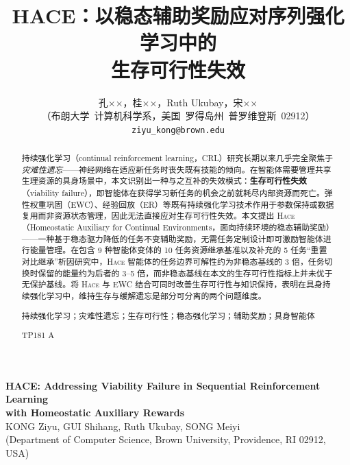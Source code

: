 \documentclass[zihao=5,a4paper,linespread=1.3,fontset=fandol]{ctexart}
\title{\heiti HACE：以稳态辅助奖励应对序列强化学习中的\\生存可行性失效}
\author{孔××，桂××，Ruth Ukubay，宋××\\[0.3em]
{\zihao{-5}（布朗大学~计算机科学系，美国~罗得岛州~普罗维登斯~02912）}\\[0.2em]
{\zihao{-5}\texttt{ziyu\_kong@brown.edu}}}
\date{}
\newcommand{\hace}{\textsc{Hace}}
\begin{document}
\maketitle

\begin{abstract}
持续强化学习（continual reinforcement learning，CRL）研究长期以来几乎完全聚焦于\emph{灾难性遗忘}——神经网络在适应新任务时丧失既有技能的倾向。在智能体需要管理共享生理资源的具身场景中，本文识别出一种与之互补的失效模式：\textbf{生存可行性失效}（viability failure），即智能体在获得学习新任务的机会之前就耗尽内部资源而死亡。弹性权重巩固（EWC）、经验回放（ER）等既有持续强化学习技术作用于参数保持或数据复用而非资源状态管理，因此无法直接应对生存可行性失效。本文提出 \hace{}（Homeostatic Auxiliary for Continual Environments，面向持续环境的稳态辅助奖励）——一种基于稳态驱力降低的任务不变辅助奖励，无需任务定制设计即可激励智能体进行能量管理。在包含 9 种智能体变体的 10 任务资源继承基准以及补充的 5 任务“重置对比继承”析因研究中，\hace{} 智能体的任务边界可解性约为非稳态基线的 3 倍，任务切换时保留的能量约为后者的 3--5 倍，而非稳态基线在本文的生存可行性指标上并未优于无保护基线。将 \hace{} 与 EWC 结合可同时改善生存可行性与知识保持，表明在具身持续强化学习中，维持生存与缓解遗忘是部分可分离的两个问题维度。

\vspace{0.5em}
持续强化学习；灾难性遗忘；生存可行性；稳态强化学习；辅助奖励；具身智能体

\vspace{0.5em}
TP181 A
\end{abstract}

\vspace{1em}
\begin{center}
{\bfseries HACE: Addressing Viability Failure in Sequential Reinforcement Learning\\ with Homeostatic Auxiliary Rewards}\\[0.5em]
{KONG Ziyu, GUI Shihang, Ruth Ukubay, SONG Meiyi}\\[0.3em]
{(Department of Computer Science, Brown University, Providence, RI 02912, USA)}
\end{center}
\end{document}
